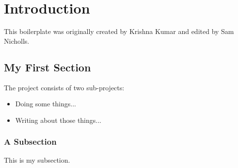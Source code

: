 \chapter{Introduction}
\ifpdf
    \graphicspath{{Document/Figs/Raster/}{Document/Figs/PDF/}{Document/Figs/}}
\else
    \graphicspath{{Document/Figs/Vector/}{Document/Figs/}}
\fi


This boilerplate was originally created by Krishna Kumar\citep{kks32} and
edited by Sam Nicholls\citep{samstudio8}.

\section{My First Section}

The project consists of two sub-projects:

\begin{itemize}
    \item Doing some things...
    \item Writing about those things...
\end{itemize}


\subsection{A Subsection}
\label{sec:subsection}

This is my subsection.

